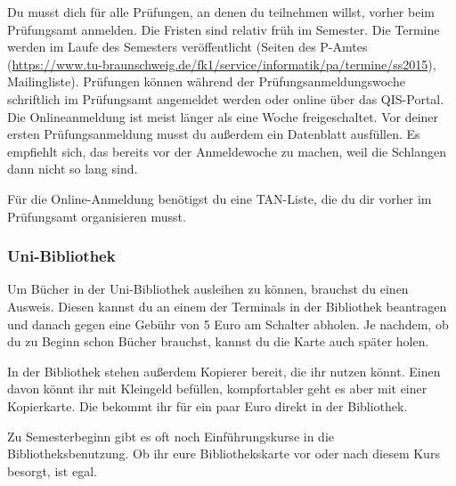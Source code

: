 \begin{multicols}{2}
	Du musst dich für alle Prüfungen, an denen du teilnehmen willst, vorher beim Prüfungsamt anmelden. Die Fristen sind relativ früh im Semester. Die Termine werden im Laufe des Semesters veröffentlicht (Seiten des P-Amtes (\url{https://www.tu-braunschweig.de/fk1/service/informatik/pa/termine/ss2015}), Mailingliste). Prüfungen können während der Prüfungsanmeldungswoche schriftlich im Prüfungsamt angemeldet werden oder online über das QIS-Portal. Die Onlineanmeldung ist meist länger als eine Woche freigeschaltet.
	Vor deiner ersten Prüfungsanmeldung musst du außerdem ein Datenblatt ausfüllen. Es empfiehlt sich, das bereits vor der Anmeldewoche zu machen, weil die Schlangen dann nicht so lang sind.

	Für die Online-Anmeldung benötigst du eine TAN-Liste, die du dir vorher im Prüfungsamt organisieren musst.

\subsubsection{Uni-Bibliothek}
	\label{todobib}

	Um Bücher in der Uni-Bibliothek ausleihen zu können, brauchst du einen Ausweis. Diesen kannst du an einem der Terminals in der Bibliothek beantragen und danach gegen eine Gebühr von 5 Euro am Schalter abholen. Je nachdem, ob du zu Beginn schon Bücher brauchst, kannst du die Karte auch später holen.

	In der Bibliothek stehen außerdem Kopierer bereit, die ihr nutzen könnt. Einen davon könnt ihr mit Kleingeld befüllen, kompfortabler geht es aber mit einer Kopierkarte. Die bekommt ihr für ein paar Euro direkt in der Bibliothek.

	Zu Semesterbeginn gibt es oft noch Einführungskurse in die Bibliotheksbenutzung. Ob ihr eure Bibliothekskarte vor oder nach diesem Kurs besorgt, ist egal.
\end{multicols}
